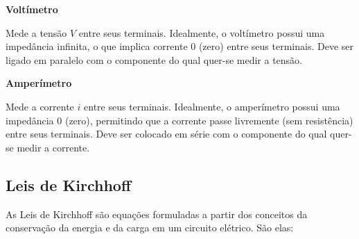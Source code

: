 \documentclass{article}
\numberwithin{equation}{section}
\newlength\Colsep
\begin{document}
\noindent\begin{minipage}{\textwidth}
    \begin{minipage}[t][4.5cm]{\dimexpr0.45\textwidth-\Colsep\relax}
        \begin{center}{\textbf{Voltímetro}}\end{center}
        Mede a tensão $V$ entre seus terminais. Idealmente, o voltímetro possui uma impedância infinita\footnotemark, o que implica corrente $0$ (zero) entre seus terminais. Deve ser ligado em paralelo com o componente do qual quer-se medir a tensão.


    \end{minipage}
    \begin{minipage}[c][4.5cm]{\dimexpr0.05\textwidth-0.5\Colsep\relax}

    \end{minipage} \hfill
    \begin{minipage}[t][4.5cm]{\dimexpr0.45\textwidth-\Colsep\relax}
        \begin{center}{\textbf{Amperímetro}}\end{center}
        Mede a corrente $i$ entre seus terminais. Idealmente, o amperímetro possui uma impedância $0$ (zero), permitindo que a corrente passe livremente (sem resistência) entre seus terminais. Deve ser colocado em série com o componente do qual quer-se medir a corrente.
    \end{minipage} \hfill
\end{minipage}

\subsection{Leis de Kirchhoff}
\label{subsec:Kirchhoff}

As Leis de Kirchhoff são equações formuladas a partir dos conceitos da conservação da energia e da carga em um circuito elétrico. São elas:
\end{document}
